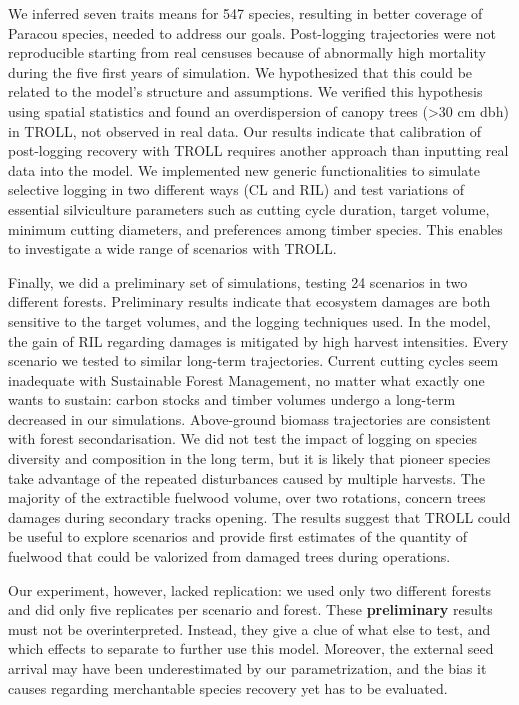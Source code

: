 \documentclass[12pt,]{article}
\theoremstyle{definition}
\theoremstyle{definition}
\theoremstyle{definition}
\theoremstyle{remark}
\begin{document}
We inferred seven traits means for 547 species, resulting in better
coverage of Paracou species, needed to address our goals. Post-logging
trajectories were not reproducible starting from real censuses because
of abnormally high mortality during the five first years of simulation.
We hypothesized that this could be related to the model's structure and
assumptions. We verified this hypothesis using spatial statistics and
found an overdispersion of canopy trees (\textgreater{}30 cm dbh) in
TROLL, not observed in real data. Our results indicate that calibration
of post-logging recovery with TROLL requires another approach than
inputting real data into the model. We implemented new generic
functionalities to simulate selective logging in two different ways (CL
and RIL) and test variations of essential silviculture parameters such
as cutting cycle duration, target volume, minimum cutting diameters, and
preferences among timber species. This enables to investigate a wide
range of scenarios with TROLL.

Finally, we did a preliminary set of simulations, testing 24 scenarios
in two different forests. Preliminary results indicate that ecosystem
damages are both sensitive to the target volumes, and the logging
techniques used. In the model, the gain of RIL regarding damages is
mitigated by high harvest intensities. Every scenario we tested to
similar long-term trajectories. Current cutting cycles seem inadequate
with Sustainable Forest Management, no matter what exactly one wants to
sustain: carbon stocks and timber volumes undergo a long-term decreased
in our simulations. Above-ground biomass trajectories are consistent
with forest secondarisation. We did not test the impact of logging on
species diversity and composition in the long term, but it is likely
that pioneer species take advantage of the repeated disturbances caused
by multiple harvests. The majority of the extractible fuelwood volume,
over two rotations, concern trees damages during secondary tracks
opening. The results suggest that TROLL could be useful to explore
scenarios and provide first estimates of the quantity of fuelwood that
could be valorized from damaged trees during operations.

Our experiment, however, lacked replication: we used only two different
forests and did only five replicates per scenario and forest. These
\textbf{preliminary} results must not be overinterpreted. Instead, they
give a clue of what else to test, and which effects to separate to
further use this model. Moreover, the external seed arrival may have
been underestimated by our parametrization, and the bias it causes
regarding merchantable species recovery yet has to be evaluated.
\end{document}
